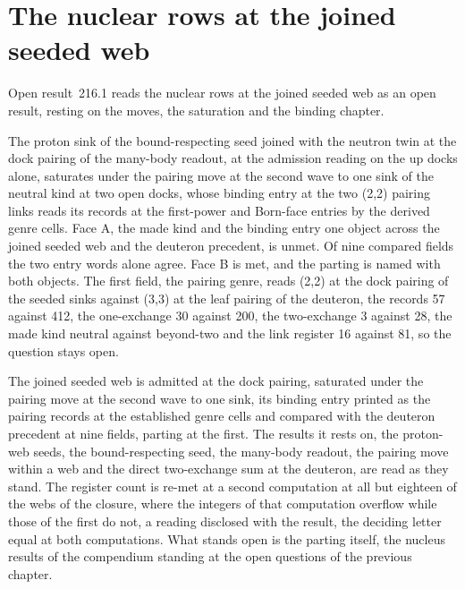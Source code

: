 \section{The nuclear rows at the joined seeded web}\label{mod:IX-7-nuclear-rows-at-the-joined-seeded-web}
\label{narr:open:9-7}Open result~216.1 reads the nuclear rows at the joined seeded web as an open result, resting on the moves, the saturation and the binding chapter.
\begin{chwall}\label{box:IX-7-nuclear-rows-at-the-joined-seeded-web:1}
The proton sink of the bound-respecting seed joined with the neutron twin at the dock pairing of the many-body readout, at the admission reading on the up docks alone, saturates under the pairing move at the second wave to one sink of the neutral kind at two open docks, whose binding entry at the two (2,2) pairing links reads its records at the first-power and Born-face entries by the derived genre cells. Face A, the made kind and the binding entry one object across the joined seeded web and the deuteron precedent, is unmet. Of nine compared fields the two entry words alone agree. Face B is met, and the parting is named with both objects. The first field, the pairing genre, reads (2,2) at the dock pairing of the seeded sinks against (3,3) at the leaf pairing of the deuteron, the records 57 against 412, the one-exchange 30 against 200, the two-exchange 3 against 28, the made kind neutral against beyond-two and the link register 16 against 81, so the question stays open.
\end{chwall}
The joined seeded web is admitted at the dock pairing, saturated under the pairing move at the second wave to one sink, its binding entry printed as the pairing records at the established genre cells and compared with the deuteron precedent at nine fields, parting at the first. The results it rests on, the proton-web seeds, the bound-respecting seed, the many-body readout, the pairing move within a web and the direct two-exchange sum at the deuteron, are read as they stand. The register count is re-met at a second computation at all but eighteen of the webs of the closure, where the integers of that computation overflow while those of the first do not, a reading disclosed with the result, the deciding letter equal at both computations. What stands open is the parting itself, the nucleus results of the compendium standing at the open questions of the previous chapter.
